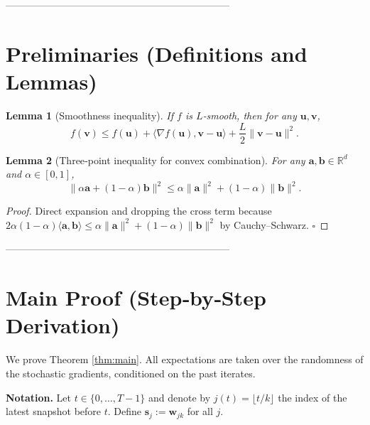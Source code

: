\documentclass{article}
\newtheorem{lemma}{Lemma}
\begin{document}
--------------------------------------------------------------------

\section*{Preliminaries (Definitions and Lemmas)}
\begin{lemma}[Smoothness inequality]\label{lem:smooth}
If $f$ is $L$‑smooth, then for any $\mathbf{u},\mathbf{v}$,
\[
f(\mathbf{v})\le f(\mathbf{u})+\langle\nabla f(\mathbf{u}),\mathbf{v}-\mathbf{u}\rangle+\frac{L}{2}\|\mathbf{v}-\mathbf{u}\|^2 .
\]
\end{lemma}
\begin{lemma}[Three‑point inequality for convex combination]\label{lem:interp}
For any $\mathbf{a},\mathbf{b}\in\mathbb{R}^d$ and $\alpha\in[0,1]$,
\[
\|\alpha\mathbf{a}+(1-\alpha)\mathbf{b}\|^2\le \alpha\|\mathbf{a}\|^2+(1-\alpha)\|\mathbf{b}\|^2 .
\]
\end{lemma}
\begin{proof}
Direct expansion and dropping the cross term because $2\alpha(1-\alpha)\langle\mathbf{a},\mathbf{b}\rangle\le \alpha\|\mathbf{a}\|^2+(1-\alpha)\|\mathbf{b}\|^2$ by Cauchy–Schwarz. \hfill$\square$
\end{proof}

--------------------------------------------------------------------

\section*{Main Proof (Step‑by‑Step Derivation)}
We prove Theorem \ref{thm:main}.  
All expectations are taken over the randomness of the stochastic gradients, conditioned on the past iterates.

\noindent\textbf{Notation.} Let $t\in\{0,\dots,T-1\}$ and denote by $j(t)=\lfloor t/k\rfloor$ the index of the latest snapshot before $t$. Define $\mathbf{s}_j:=\mathbf{w}_{jk}$ for all $j$.
\end{document}
